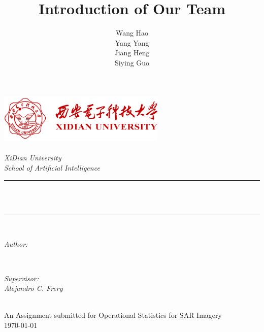 \documentclass[12pt]{article}
\title{Introduction of Our Team}
\author{\textup{Wang Hao\\Yang Yang\\Jiang Heng\\Siying Guo}}
\begin{document}
\titleformat{\section}{\LARGE\bfseries}{\thesection}{1em}{}  %
\begin{titlepage}
	\newcommand{\HRule}{\rule{\linewidth}{0.5mm}}
	\includegraphics[width=8cm]{xd.png}\\[1cm] 
	\center 
	\quad\\[1.5cm]
	\textsl{\Large XiDian University }\\[0.5cm] 
	\textsl{\large School of Artificial Intelligence}\\[0.5cm] 
	\makeatletter
	\HRule \\[0.4cm]
	{ \huge \bfseries \@title}\\[0.4cm] 
	\HRule \\[1.5cm]
	
	\begin{minipage}{0.4\textwidth}
		\begin{flushleft} \large
			\emph{Author:}\\
			\@author 
		\end{flushleft}
	\end{minipage}
	~
	\begin{minipage}{0.4\textwidth}
		\begin{flushright} \large
			\emph{Supervisor:\\ \textup{Alejandro C. Frery}}
		\end{flushright}
	\end{minipage}\\[5cm]
	\makeatother
	{\large An Assignment submitted for Operational Statistics for SAR Imagery}\\[0.5cm]
	{\large \today}\\[2cm] 
	\vfill 
\end{titlepage}

\newpage
\end{document}
